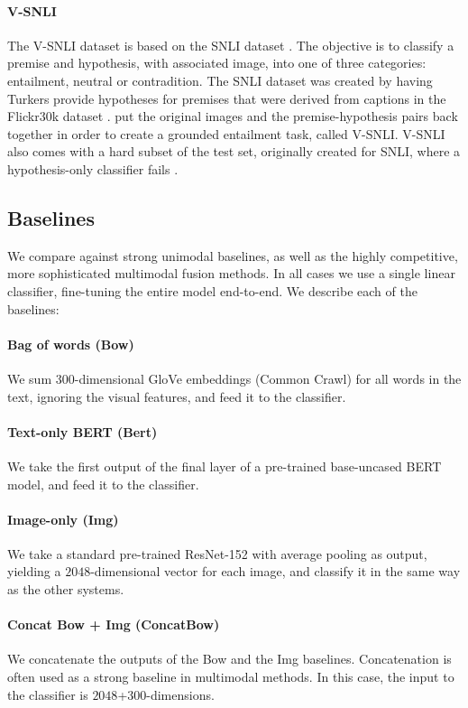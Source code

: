 \documentclass[11pt,a4paper]{article}
\begin{document}
\paragraph{V-SNLI} The V-SNLI dataset is based on the SNLI dataset \cite{Bowman:2015snli}. The objective is to classify a premise and hypothesis, with associated image, into one of three categories: entailment, neutral or contradition. The SNLI dataset was created by having Turkers provide hypotheses for premises that were derived from captions in the Flickr30k dataset \cite{Young:2014flickr30k}. \cite{Vu:2018vsnli} put the original images and the premise-hypothesis pairs back together in order to create a grounded entailment task, called V-SNLI. V-SNLI also comes with a hard subset of the test set, originally created for SNLI, where a hypothesis-only classifier fails \cite{Gururangan:2018arxiv}.

\subsection{Baselines}

We compare against strong unimodal baselines, as well as the highly competitive, more sophisticated multimodal fusion methods. In all cases we use a single linear classifier, fine-tuning the entire model end-to-end. We describe each of the baselines:

\paragraph{Bag of words (Bow)} We sum 300-dimensional GloVe embeddings \cite{Pennington:2014glove} (Common Crawl) for all words in the text, ignoring the visual features, and feed it to the classifier.
\paragraph{Text-only BERT (Bert)} We take the first output of the final layer of a pre-trained base-uncased BERT model, and feed it to the classifier.
\paragraph{Image-only (Img)} We take a standard pre-trained ResNet-152 with average pooling as output, yielding a $2048$-dimensional vector for each image, and classify it in the same way as the other systems.
\paragraph{Concat Bow + Img (ConcatBow)} We concatenate the outputs of the Bow and the Img baselines. Concatenation is often used as a strong baseline in multimodal methods. In this case, the input to the classifier is $2048$+$300$-dimensions.
\end{document}
